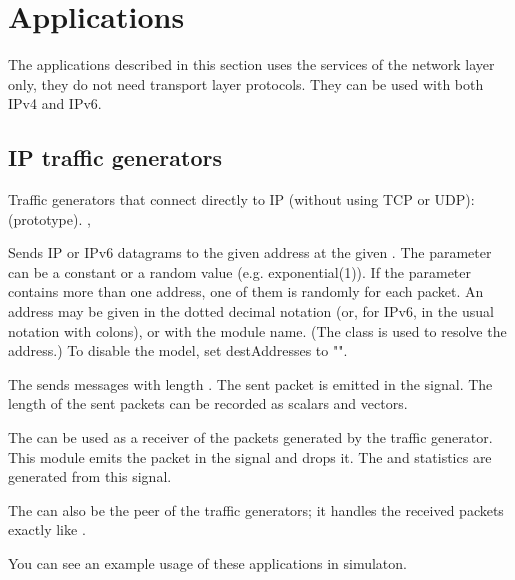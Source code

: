 


\section{Applications}

The applications described in this section uses the services of the network
layer only, they do not need transport layer protocols.
They can be used with both IPv4 and IPv6.

\subsection{IP traffic generators}

Traffic generators that connect directly to IP (without using TCP or UDP):
 (prototype).
 ,

Sends IP or IPv6 datagrams to the given address at the given .
The  parameter can be a constant or a random value (e.g. exponential(1)).
If the  parameter contains more than one address, one
of them is randomly for each packet. An address may be given in the
dotted decimal notation (or, for IPv6, in the usual notation with colons),
or with the module name. (The  class is used to resolve
the address.) To disable the model, set destAddresses to "".

The  sends messages with length .
The sent packet is emitted in the  signal.
The length of the sent packets can be recorded as scalars and vectors.

The  can be used as a receiver of the packets
generated by the traffic generator. This module emits the packet
in the  signal and drops it. The 
and  statistics are generated from this signal.

The  can also be the peer of the traffic generators;
it handles the received packets exactly like .

You can see an example usage of these applications in 
simulaton.

